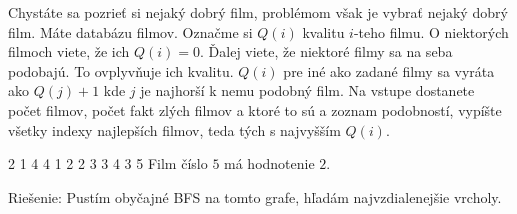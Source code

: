 
Chystáte sa pozrieť si nejaký dobrý film, problémom však
je vybrať nejaký dobrý film. Máte databázu filmov. Označme
si $Q(i)$ kvalitu $i$-teho filmu. O niektorých filmoch viete,
že ich $Q(i)=0$. Ďalej viete, že niektoré filmy sa na seba
podobajú. To ovplyvňuje ich kvalitu. $Q(i)$ pre iné ako zadané
filmy sa vyráta ako $Q(j)+1$ kde $j$ je najhorší k nemu podobný
film. Na vstupe dostanete počet filmov, počet fakt zlých filmov
a ktoré to sú a zoznam podobností, vypíšte všetky indexy najlepších filmov, teda tých
s najvyšším $Q(i)$.

 2
1 4
4
1 2
2 3
3 4
3 5
\komentar
Film číslo $5$ má hodnotenie $2$.
\koniec

Riešenie: Pustím obyčajné BFS na tomto grafe, hľadám najvzdialenejšie vrcholy.
